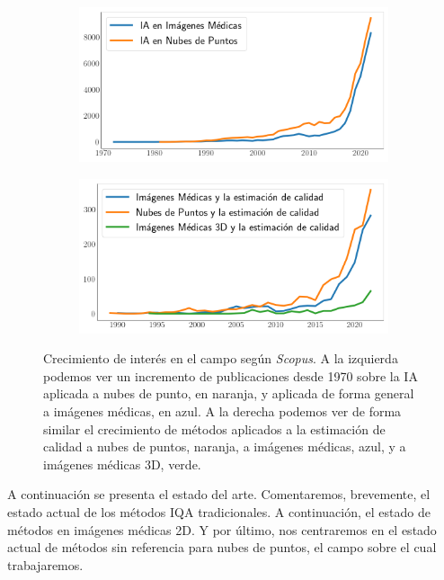 \begin{figure}[H]
  \centering
  \begin{subfigure}{0.49\textwidth}
    \includegraphics[width=\textwidth]{imagenes/chapter3/ScopusMLinMedicineAndPC.png}
  \end{subfigure}
  \begin{subfigure}{0.5\textwidth}
    \includegraphics[width=\textwidth]{imagenes/chapter3/ScopusQualityAssessment.png}
  \end{subfigure}
  \caption[Crecimiento de interés en el campo según \emph{Scopus}]{Crecimiento de interés en el campo según \emph{Scopus}\footnotemark[1].
  A la izquierda podemos ver un incremento de publicaciones desde 
  1970 sobre la IA aplicada a nubes de punto, en naranja, 
  y aplicada de forma general a imágenes médicas, en azul. A la derecha 
  podemos ver de forma similar el crecimiento de métodos aplicados
  a la estimación de calidad a nubes de puntos, naranja, a imágenes médicas, azul, y 
  a imágenes médicas 3D, verde.
  }
  \label{fig:ScopusMLinMedicalAndPC}
\end{figure}
A continuación se presenta el estado del arte. Comentaremos, brevemente, el 
estado actual de los métodos IQA tradicionales. A continuación,
el estado de métodos en imágenes médicas 2D. Y por último, nos centraremos 
en el estado actual de métodos sin referencia para nubes de puntos, el campo 
sobre el cual trabajaremos.

